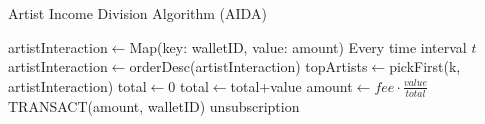 \begin{algorithm}
\caption{Artist Income Division Algorithm (AIDA)}
\label{alg:aida}
\begin{algorithmic}
\State artistInteraction$\gets$Map(key: walletID, value: amount)
    \Repeat{} Every time interval $t$
    \State artistInteraction$\gets$orderDesc(artistInteraction)
    \State topArtists$\gets$pickFirst(k, artistInteraction)
    \State total$\gets$0
        \State total$\gets$total+value
    \EndFor
        \State amount$\gets fee \cdot\frac{value}{total}$
        \State TRANSACT(amount, walletID)
    \EndFor
    \Until unsubscription
\EndFunction
\end{algorithmic}
\end{algorithm}